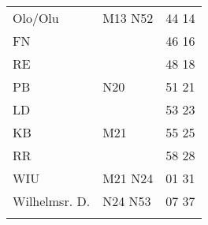 \begin{tabular}{!{\color{schiefergrau}\vrule width 3pt}*{3}{l!{\color{schiefergrau}\vrule width 3pt}}}
Olo/Olu      & \nuneun{} \mtram{} M13 \nbus{} N52                         & 44 14 \\
FN           &                                                            & 46 16 \\
RE           &                                                            & 48 18 \\
PB           & \nbus{} N20                                                & 51 21 \\
LD           &                                                            & 53 23 \\
KB           & \mbus{} M21                                                & 55 25 \\
RR           &                                                            & 58 28 \\
WIU          & \mbus{} M21 \nbus{} N24                                    & 01 31 \\
Wilhelmsr. D.& \nbus{} N24 N53                                            & 07 37 \\
\myhline
\end{tabular}
